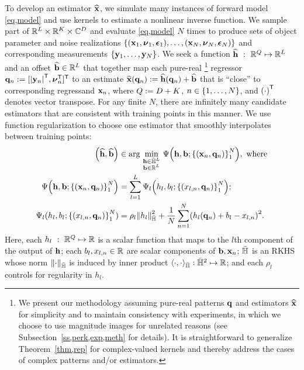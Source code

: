 To develop an estimator $\widehat{\mathbf{x}}$,
we simulate many instances 
of forward model \eqref{eq,model}
and use kernels
to estimate a nonlinear inverse function.
We sample part of $\mathbb{R}^{L} \times \mathbb{R}^{K} \times \mathbb{C}^{D}$
and evaluate \eqref{eq,model} $N$ times
to produce sets of object parameter and noise realizations
$\set{\paren{\bmx_1,\bmnu_1,\bmeps_1},\dots,\paren{\bmx_N,\bmnu_N,\bmeps_N}}$
and corresponding measurements
$\set{\bmy_1,\dots,\bmy_N}$. 
We seek a function
$\widehat{\mathbf{h}}~:~\mathbb{R}^{Q} \mapsto \mathbb{R}^{L}$
and an offset $\widehat{\mathbf{b}} \in \mathbb{R}^{L}$
that together map each pure-real
\footnote{%
	We present our methodology 
	assuming pure-real patterns $\mathbf{q}$ 
	and estimators $\widehat{\mathbf{x}}$
	for simplicity and 
	to maintain consistency
	with experiments,
	in which we choose to use magnitude images
	for unrelated reasons 
	(see Subsection~\ref{ss,perk,exp,meth} for details). 
	It is straightforward 
	to generalize Theorem~\ref{thm,rep}
	for complex-valued kernels 
	and thereby address the cases 
	of complex patterns and/or estimators.
}
regressor $\bmq_n := [\abs{\bmy_n}\tpose, \bmnu_n\tpose]\tpose$
to an estimate 
$\bmxha{\bmq_n} := \bmhha{\bmq_n}+\est{\bmb}$ 
that is ``close'' 
to corresponding regressand $\mathbf{x}_n$,
where $Q := D+K$,
$n \in \set{1,\dots,N}$,
and $\paren{\cdot}\tpose$ denotes vector transpose.
For any finite $N$,
there are infinitely many candidate estimators
that are consistent with training points
in this manner.
We use function regularization
to choose one estimator
that smoothly interpolates 
between training points:
\begin{align}
	\paren{\est{\bmh},\est{\bmb}} &\in 
		\argmin{\substack{\bmh \in \rkhs^L \\ \bmb \in \reals{L}}}
		\costa{\bmh, \bmb; \set{\paren{\bmx_n,\bmq_n}}_{1}^N}, 
		\where \label{eq,prob} \\
	\costa{\bmh, \bmb; \set{\paren{\bmx_n,\bmq_n}}_{1}^N} &= 
		\sum_{l=1}^L \cost_l\paren{h_l,b_l; \set{\paren{x_{l,n},\bmq_n}}_{1}^N}; 
		\label{eq,cost} \\
	\Psi_l(h_l,b_l; \set{\paren{x_{l,n},\bmq_n}}_{1}^N) &= 
		\rho_l \norm{h_l}_\rkhs^2 + 
		\frac{1}{N} \sum_{n=1}^N \paren{h_l(\bmq_n) + b_l - x_{l,n}}^2.
		\label{eq,cost-l}
\end{align}
Here, each $h_l~:~\mathbb{R}^{Q} \mapsto \mathbb{R}$ is a scalar function
that maps to the $l$th component of the output of $\mathbf{h}$; 
each $b_l,x_{l,n} \in \mathbb{R}$ are scalar components of $\mathbf{b},\mathbf{x}_n$;
${\bar{\mathbb{H}}}$ is an RKHS 
whose norm $\norm{\cdot}_\rkhs$ 
is induced by inner product 
$\langle \cdot,\cdot \rangle_{\bar{\mathbb{H}}} : {\bar{\mathbb{H}}}^2 \mapsto \mathbb{R}$; 
and each $\rho_l$ controls for regularity in $h_l$.

